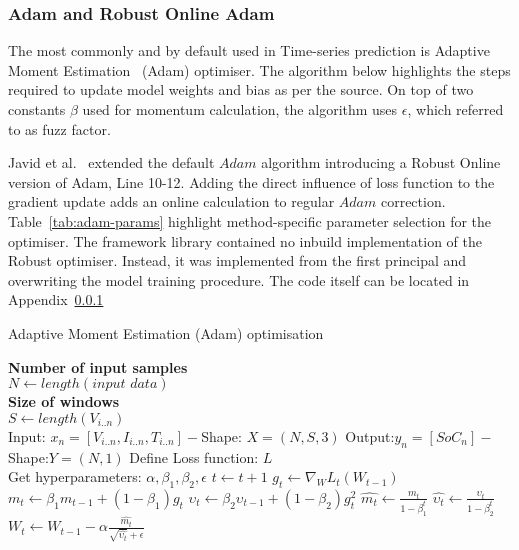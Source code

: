 \subsubsection{Adam and Robust Online Adam}
The most commonly and by default used in Time-series prediction is Adaptive Moment Estimation~\cite{kingma_adam_2017} (Adam) optimiser.
The algorithm below highlights the steps required to update model weights and bias as per the source.
On top of two constants $\beta$ used for momentum calculation, the algorithm uses $\epsilon$, which referred to as fuzz factor.

%
%
Javid et al.~\cite{javid_adaptive_2020} extended the default $Adam$ algorithm introducing a Robust Online version of Adam, Line 10-12.
Adding the direct influence of loss function to the gradient update adds an online calculation to regular $Adam$ correction.
Table~\ref{tab:adam-params} highlight method-specific parameter selection for the optimiser.
The framework library contained no inbuild implementation of the Robust optimiser.
Instead, it was implemented from the first principal and overwriting the model training procedure.
The code itself can be located in Appendix~\ref{}
\begin{algorithm}
  \caption{Adaptive Moment Estimation (Adam) optimisation}
  \begin{algorithmic}[1]
    \STATE \textbf{Number of input samples} \\ $N\gets length(\textit{input data})$\\
    \STATE \textbf{Size of windows} \\ $S\gets length(V_{i..n})$\\
    \STATE Input: $x_n = [V_{i..n}, I_{i..n}, T_{i..n}] - $Shape: $X = (N, S, 3)$
    \STATE Output:$y_n = [SoC_{n}] - $Shape:$Y = (N, 1)$
    \STATE Define Loss function: $L$ \\
           Get hyperparameters: $\alpha, \beta_1, \beta_2, \epsilon$
    \STATE $t \gets t+1$
    \STATE $g_t \gets \nabla_W L_t (W_{t-1})$ 
    \STATE $m_t \gets \beta_1 m_{t-1}+(1-\beta_1) g_t $ 
    \STATE $\upsilon_t \gets \beta_2 \upsilon_{t-1}+ \left(1-\beta_2 \right)g^2_t $ 
    \STATE $\hat{m_t} \gets \frac{m_t}{1-\beta^t_1}$ 
    \STATE $\hat{\upsilon_t} \gets \frac{\upsilon_t}{1-\beta^t_2} $ 
    \STATE $W_t \gets W_{t-1}- \alpha \frac{\hat{m_t}}{\sqrt{\hat{\upsilon_t}}+\epsilon} $ 
    \ENDWHILE
  \end{algorithmic}
  \label{alg:Adam}
\end{algorithm}
